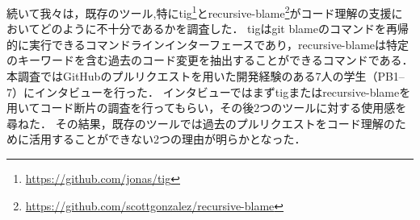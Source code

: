 続いて我々は，既存のツール,特にtig\footnote{\url{https://github.com/jonas/tig}}とrecursive-blame\footnote{\url{https://github.com/scottgonzalez/recursive-blame}}がコード理解の支援においてどのように不十分であるかを調査した．
tigはgit blameのコマンドを再帰的に実行できるコマンドラインインターフェースであり，recursive-blameは特定のキーワードを含む過去のコード変更を抽出することができるコマンドである．
本調査ではGitHubのプルリクエストを用いた開発経験のある7人の学生（PB1--7）にインタビューを行った．
インタビューではまずtigまたはrecursive-blameを用いてコード断片の調査を行ってもらい，その後2つのツールに対する使用感を尋ねた．
その結果，既存のツールでは過去のプルリクエストをコード理解のために活用することができない2つの理由が明らかとなった．





